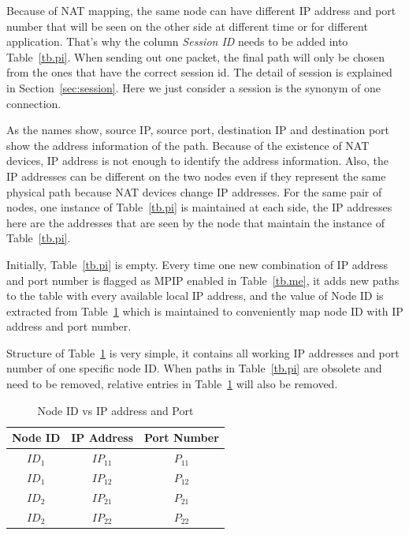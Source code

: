 Because of NAT mapping, the same node can have different IP address and port number that will be seen on the other side at different time or for different application. That's why the column \emph{Session ID} needs to be added into Table~\ref{tb.pi}. When sending out one packet, the final path will only be chosen from the ones that have the correct session id. The detail of session is explained in Section~\ref{sec:session}. Here we just consider a session is the synonym of one connection.

As the names show, source IP, source port, destination IP and destination port show the address information of the path. Because of the existence of NAT devices, IP address is not enough to identify the address information. Also, the IP addresses can be different on the two nodes even if they represent the same physical path because NAT devices change IP addresses. For the same pair of nodes, one instance of Table~\ref{tb.pi} is maintained at each side, the IP addresses here are the addresses that are seen by the node that maintain the instance of Table~\ref{tb.pi}.

Initially, Table~\ref{tb.pi} is empty. Every time one new combination of IP address and port number is flagged as MPIP enabled in Table~\ref{tb.me}, it adds new paths to the table with every available local IP address, and the value of Node ID is extracted from Table~\ref{tb.wi} which is maintained to conveniently map node ID with IP address and port number. 

Structure of Table~\ref{tb.wi} is very simple, it contains all working IP addresses and port number of one specific node ID. When paths in Table~\ref{tb.pi} are obsolete and need to be removed, relative entries in Table~\ref{tb.wi} will also be removed.

\begin{table}[htbp]
\caption{\label{tb.wi}Node ID vs IP address and Port}
\centering
\begin{tabular}{|c|c|c|}
\hline
 Node ID  & IP Address & Port Number\\
\hline
${ID}_{1}$&${IP}_{11}$&${P}_{11}$ \\
\hline
${ID}_{1}$&${IP}_{12}$&${P}_{12}$ \\
\hline
${ID}_{2}$&${IP}_{21}$&${P}_{21}$ \\
\hline
${ID}_{2}$&${IP}_{22}$&${P}_{22}$ \\
\hline
\end{tabular}
\end{table}


